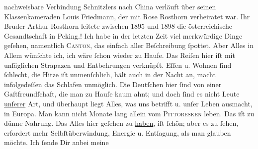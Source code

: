 \begin{ledgroupsized}[t]{13cm}
{{{                  nachweisbare Verbindung Schnitzlers nach China verläuft über seinen Klassenkameraden
                     Louis Friedmann, der mit Rose Rosthorn verheiratet war. Ihr Bruder
                     Arthur Rosthorn leitete zwischen
                     1895 und 1898 die österreichische Gesandtschaft in
                     Peking.}}}\label{K_L02845-1h}!\pend
           \pstart
           Ich habe in der letzten {\pb}Zeit viel merkwürdige Dinge
               geſehen, namentlich \textsc{Canton}, das einfach aller Beſchreibung ſpottet.\pend
           \pstart
           Aber Alles in Allem wünſchte ich, ich wäre ſchon wieder zu Haufe. Das Reiſen hier iſt
               mit unſäglichen Strapazen und Entbehrungen verknüpft. Eſſen u. Wohnen ſind ſchlecht,
               die Hitze iſt \strikeout{\textcolor{gray}{e}\textcolor{gray}{×}} unmenſchlich, hält auch in der Nacht an, macht infolgedeſſen das Schlafen
               unmöglich. Die Deutſchen hier
               ſind von einer {\pb}Gaſtfreundſchaft, die man zu Hauſe
               kaum ahnt; und doch ſind es nicht Leute \uline{unſerer} Art,
               und überhaupt liegt Alles, was uns betrifft u. unſer Leben ausmacht, in Europa.  Man
               kann nicht Monate lang allein vom \textsc{Pittoresken} leben. Das
               iſt zu dünne Nahrung. Das Alles hier geſehen zu \uline{haben}, iſt ſchön;  aber es zu ſehen, erfordert mehr Selbſtüberwindung, Energie u. Entſagung, als man
               glauben möchte.\pend
           \pstart
           Ich ſende Dir anbei meine \label{K_L02845-2v}
\end{ledgroupsized}
